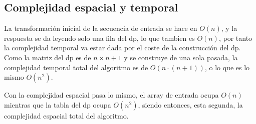 \documentclass[11pt]{article}
\begin{document}
    \subsection{Complejidad espacial y temporal}
    La transformación inicial de la secuencia de entrada se hace en $O(n)$, y la respuesta se da leyendo solo
    una fila del dp, lo que tambien es $O(n)$, por tanto la complejidad temporal va estar dada por el coste
    de la construcción del dp. Como la matriz del dp es de $n \times n + 1$ y se construye de una sola pasada,
    la complejidad temporal total del algoritmo es de $O(n \cdot (n+1))$, o lo que es lo mismo $O(n^2)$.

    Con la complejidad espacial pasa lo mismo, el array de entrada ocupa $O(n)$ mientras que la tabla del dp ocupa
    $O(n^2)$, siendo entonces, esta segunda, la complejidad espacial total del algoritmo.
\end{document}
